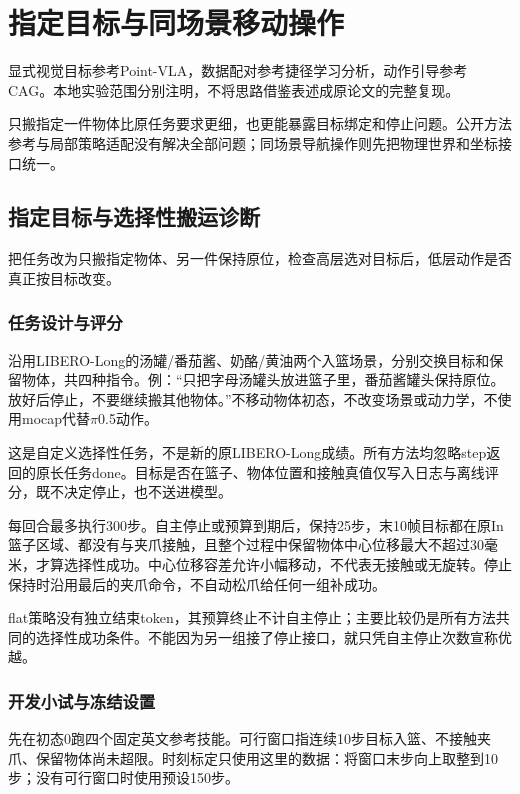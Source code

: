 \chapter{指定目标与同场景移动操作}
显式视觉目标参考Point-VLA\cite{pointvla}，数据配对参考捷径学习分析\cite{shortcut}，动作引导参考CAG\cite{cag}。本地实验范围分别注明，不将思路借鉴表述成原论文的完整复现。


只搬指定一件物体比原任务要求更细，也更能暴露目标绑定和停止问题。公开方法参考与局部策略适配没有解决全部问题；同场景导航操作则先把物理世界和坐标接口统一。

\section{指定目标与选择性搬运诊断}

\label{stage:s13}

把任务改为只搬指定物体、另一件保持原位，检查高层选对目标后，低层动作是否真正按目标改变。

\subsection{任务设计与评分}\label{s13-detail-1}

沿用LIBERO-Long的汤罐/番茄酱、奶酪/黄油两个入篮场景，分别交换目标和保留物体，共四种指令。例：``只把字母汤罐头放进篮子里，番茄酱罐头保持原位。放好后停止，不要继续搬其他物体。''不移动物体初态，不改变场景或动力学，不使用mocap代替\(\pi\)0.5动作。

这是自定义选择性任务，不是新的原LIBERO-Long成绩。所有方法均忽略step返回的原长任务done。目标是否在篮子、物体位置和接触真值仅写入日志与离线评分，既不决定停止，也不送进模型。

每回合最多执行300步。自主停止或预算到期后，保持25步，末10帧目标都在原In篮子区域、都没有与夹爪接触，且整个过程中保留物体中心位移最大不超过30毫米，才算选择性成功。中心位移容差允许小幅移动，不代表无接触或无旋转。停止保持时沿用最后的夹爪命令，不自动松爪给任何一组补成功。

flat策略没有独立结束token，其预算终止不计自主停止；主要比较仍是所有方法共同的选择性成功条件。不能因为另一组接了停止接口，就只凭自主停止次数宣称优越。

\subsection{开发小试与冻结设置}\label{s13-detail-2}

先在初态0跑四个固定英文参考技能。可行窗口指连续10步目标入篮、不接触夹爪、保留物体尚未超限。时刻标定只使用这里的数据：将窗口末步向上取整到10步；没有可行窗口时使用预设150步。

